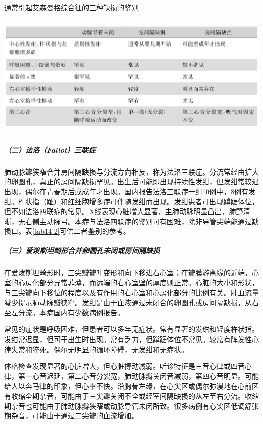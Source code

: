 \begin{table}[htbp]
\centering
\caption{通常引起艾森曼格综合征的三种缺损的鉴别}
\label{tab14-3}
\includegraphics[width=5.89583in,height=2.33333in]{./images/Image00095.jpg}
\end{table}

\subparagraph{（二）法洛（Fallot）三联症}

肺动脉瓣狭窄合并房间隔缺损与分流方向相反，称为法洛三联症。分流常经由扩大的卵圆孔，真正的房间隔缺损罕见。出生后可能即出现持续性发绀，但发绀常较迟出现，偶尔在青春期后或成年才出现。国内报告法洛三联症一组10例中，8例有发绀。杵状指（趾）和红细胞增多症可伴随发绀而出现。发绀患者可出现蹲踞体位，但不如法洛四联症的常见。X线表现心脏增大显著，主肺动脉明显凸出，肺野清晰，无右侧主动脉弓。本症与法洛四联症的鉴别可有困难，除非导管尖端能通过缺损口。表\ref{tab14-2}可供二者鉴别的参考。

\subparagraph{（三）爱泼斯坦畸形合并卵圆孔未闭或房间隔缺损}

在爱泼斯坦畸形时，三尖瓣瓣叶变形和向下移进右心室；在瓣膜游离缘的近端，心室的心房化部分异常菲薄，而远端的右心室壁的厚度则正常。心脏的大小和形状，与三尖瓣向下移位的程度以及有作用的右心室和心房化部分的比例有关。肺血流量减少提示肺动脉瓣狭窄。发绀是由于血液通过未闭合的卵圆孔或房间隔缺损，从右至左分流。本病国内有少数病例报告。

常见的症状是呼吸困难，但患者可以多年无症状。常有显著的发绀和轻度杵状指。发绀常迟显，但可于出生时出现。常有乏力，但蹲踞体位不常见。较常有阵发性心律失常和猝死。偶尔无明显的循环障碍，无发绀和无症状。

体格检查发现显著的心脏增大，但心脏搏动减弱。听诊特征是三音心律或四音心律，第一心音迟延，第二心音分裂宽，肺动脉瓣关闭音减弱，第四心音明显。可能给人以奔马律的印象，但心率不快。沿胸骨左缘，在心尖区或偶尔弥漫地在心前区有收缩全期杂音，可能由于三尖瓣关闭不全或经室间隔缺损的从左至右分流。收缩期杂音也可能由于肺动脉瓣狭窄或动脉导管未闭所致。很多病例有心尖区低调舒张期杂音，可能由于通过二尖瓣的血流增加。

